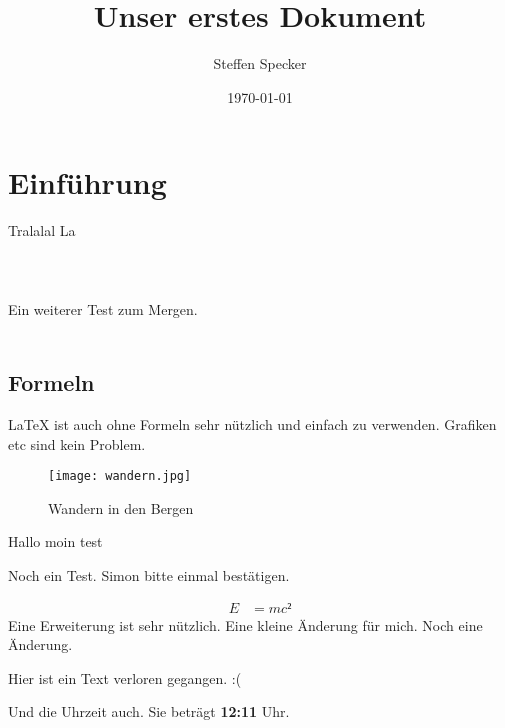\documentclass[12pt,a4paper]{article}
\author{Steffen Specker}
\title{Unser erstes Dokument}
\date{\today}
\begin{document}
\maketitle
\tableofcontents

\newpage

\section{Einführung}

Tralalal La
\\
\\
\\
\\
Ein weiterer Test zum Mergen.
\\
\\




\subsection{Formeln}

\LaTeX{} ist auch ohne Formeln sehr nützlich und einfach zu verwenden. Grafiken etc sind kein Problem.


\begin{figure}[h]
\begin{center}
\texttt{[image: wandern.jpg]}
\caption{Wandern in den Bergen}
\label{wandern.pgtest}

\end{center}
\end{figure}

Hallo moin test

Noch ein Test. Simon bitte einmal bestätigen.

\begin{align*}
E &= mc²
\end{align*}
Eine Erweiterung ist sehr nützlich.
Eine kleine Änderung für mich.
Noch eine Änderung.


Hier ist ein Text verloren gegangen. :(

Und die Uhrzeit auch. 
Sie beträgt \textbf{12:11} Uhr. 
\end{document}
